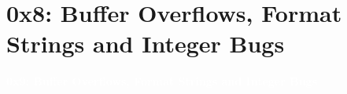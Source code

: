 \documentclass[aspectratio=169]{beamer}
\begin{document}
\section{0x8: Buffer Overflows, Format Strings and Integer Bugs}
{
\begin{frame}
\huge{\textcolor{white}{\textbf{0x9: Buffer Overflows, Format Strings and Integer Bugs}}}
\end{frame}
}
\end{document}

